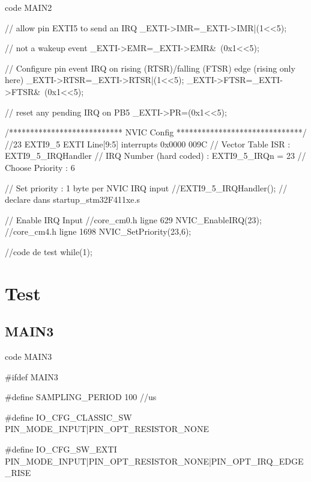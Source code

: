 {\begin{Cpp}{code MAIN2}
{    // allow pin EXTI5 to send an IRQ
    _EXTI->IMR=_EXTI->IMR|(1<<5);
    
    // not a wakeup event
    _EXTI->EMR=_EXTI->EMR&~(0x1<<5);
    
    // Configure pin event IRQ on rising (RTSR)/falling (FTSR) edge (rising only here)
    _EXTI->RTSR=_EXTI->RTSR|(1<<5);
    _EXTI->FTSR=_EXTI->FTSR&~(0x1<<5);
    
    // reset any pending IRQ on PB5
    _EXTI->PR=(0x1<<5);
    
    /*************************** NVIC Config ******************************/
    //23  EXTI9_5 EXTI Line[9:5] interrupts 0x0000 009C
    // Vector Table ISR         : EXTI9_5_IRQHandler
    // IRQ Number (hard coded)  : EXTI9_5_IRQn = 23
    // Choose Priority          : 6
    
    // Set priority : 1 byte per NVIC IRQ input
    //EXTI9_5_IRQHandler(); // declare dans startup_stm32F411xe.s
    
    // Enable IRQ Input
    //core_cm0.h ligne 629
    NVIC_EnableIRQ(23);
    //core_cm4.h ligne 1698
    NVIC_SetPriority(23,6); 

    //code de test   
    while(1){;}    
}

\end{Cpp}

\section{Test}



\newpage
\subsection{MAIN3}

\begin{Cpp}{code MAIN3} 

#ifdef MAIN3

#define SAMPLING_PERIOD     100     //us                            



#define IO_CFG_CLASSIC_SW           PIN_MODE_INPUT|PIN_OPT_RESISTOR_NONE  

#define IO_CFG_SW_EXTI      PIN_MODE_INPUT|PIN_OPT_RESISTOR_NONE|PIN_OPT_IRQ_EDGE_RISE


\end{Cpp}}
